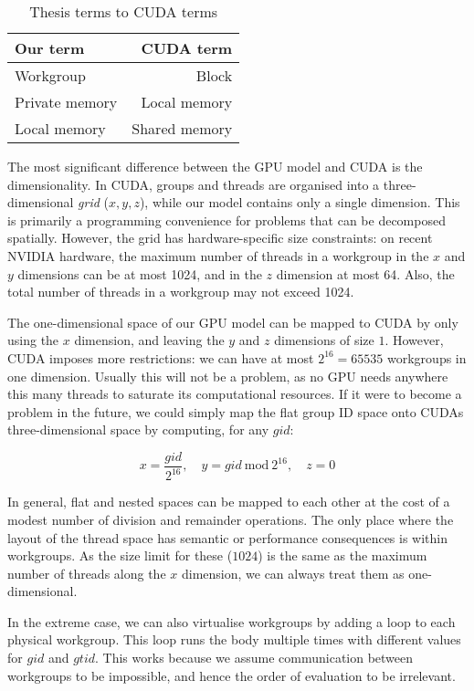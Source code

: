 \begin{table}
  \centering
  \begin{tabular}{l|r}
    \textbf{Our term} & \textbf{CUDA term} \\\hline
    Workgroup & Block \\
    Private memory & Local memory \\
    Local memory & Shared memory
  \end{tabular}
  \caption{Thesis terms to CUDA terms}
  \label{tab:cuda-terms}
\end{table}

The most significant difference between the GPU model and CUDA is the
dimensionality.  In CUDA, groups and threads are organised into a
three-dimensional \textit{grid} ($x,y,z$), while our model contains
only a single dimension.  This is primarily a programming convenience
for problems that can be decomposed spatially.  However, the grid has
hardware-specific size constraints: on recent NVIDIA hardware, the
maximum number of threads in a workgroup in the $x$ and $y$ dimensions
can be at most 1024, and in the $z$ dimension at most 64.  Also, the
total number of threads in a workgroup may not exceed 1024.

The one-dimensional space of our GPU model can be mapped to CUDA by
only using the $x$ dimension, and leaving the $y$ and $z$ dimensions
of size $1$.  However, CUDA imposes more restrictions: we can have at
most $2^{16}=65535$ workgroups in one dimension.  Usually this will
not be a problem, as no GPU needs anywhere this many threads to
saturate its computational resources.  If it were to become a problem
in the future, we could simply map the flat group ID space onto CUDAs
three-dimensional space by computing, for any $gid$:

\[
x = \frac{gid}{2^{16}},\quad y = gid\ \text{mod}\ 2^{16}, \quad z = 0
\]

In general, flat and nested spaces can be mapped to each other at the
cost of a modest number of division and remainder operations.  The
only place where the layout of the thread space has semantic or
performance consequences is within workgroups.  As the size limit for
these ($1024$) is the same as the maximum number of threads along the
$x$ dimension, we can always treat them as one-dimensional.

In the extreme case, we can also virtualise workgroups by adding a
loop to each physical workgroup.  This loop runs the body multiple
times with different values for $gid$ and $gtid$.  This works because
we assume communication between workgroups to be impossible, and hence
the order of evaluation to be irrelevant.


